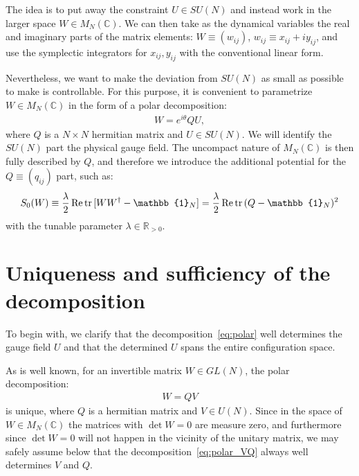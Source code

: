 \documentclass[12pt]{article}
\begin{document}
The idea is to put away the constraint $U \in SU(N)$
and instead work in the larger space $W \in M_N(\mathbb{C})$.
We can then take as the dynamical variables the real and imaginary parts
of the matrix elements:
$W \equiv (w_{ij})$, $w_{ij} \equiv x_{ij}+iy_{ij}$,
and use the symplectic integrators
for $x_{ij}, y_{ij}$ with the conventional linear form.

Nevertheless, we want to make the deviation
from $SU(N)$ as small as possible
to make is controllable.
For this purpose, it is convenient to parametrize $W \in M_N(\mathbb{C})$
in the form of a polar decomposition:
\begin{align}
  W = e^{i\theta} Q U,
  \label{eq:polar}
\end{align}
where $Q$ is a $N\times N$ hermitian matrix and $U \in SU(N)$.
We will identify the $SU(N)$ part the physical gauge field.
The uncompact nature of $M_N(\mathbb{C})$ is then fully described by $Q$,
and therefore we introduce the additional potential
for the $Q\equiv (q_{ij})$ part, such as:
\begin{align}
  S_0(W)
  \equiv \frac{\lambda}{2} \, {\rm Re}\,{\rm tr} \,[W W^\dagger-\mathbb{1}_N]
  = \frac{\lambda}{2} \,{\rm Re}\,{\rm tr} \,(Q-\mathbb{1}_N)^2
  \label{eq:s0}
\end{align}
with the tunable parameter $\lambda \in \mathbb{R}_{>0}$.


\section{Uniqueness and sufficiency of the decomposition}
\label{sec:polar}

To begin with,
we clarify that the decomposition~\eqref{eq:polar}
well determines the gauge field $U$ and
that the determined $U$ spans the entire configuration space.

As is well known, for an invertible matrix $W \in GL(N)$,
the polar decomposition:
\begin{align}
  W = Q V
  \label{eq:polar_VQ}
\end{align}
is unique, where $Q$ is a hermitian matrix and $V \in U(N)$.
Since in the space of $W \in M_N(\mathbb{C})$
the matrices with $\det W=0$ are measure zero,
and furthermore since $\det W=0$ will not
happen in the vicinity of the unitary matrix,
we may safely assume below
that the decomposition~\eqref{eq:polar_VQ}
always well determines $V$ and $Q$.
\end{document}
